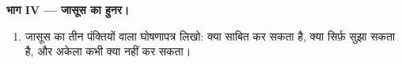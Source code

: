\begin{problem}
\medskip\noindent\textbf{भाग IV --- जासूस का हुनर।}
\begin{enumerate}[resume]
  \item जासूस का तीन पंक्तियों वाला घोषणापत्र लिखो:  क्या साबित
        कर सकता है, क्या सिर्फ़ सुझा सकता है, और अकेला कभी क्या नहीं
        कर सकता।
\end{enumerate}
\end{problem}
